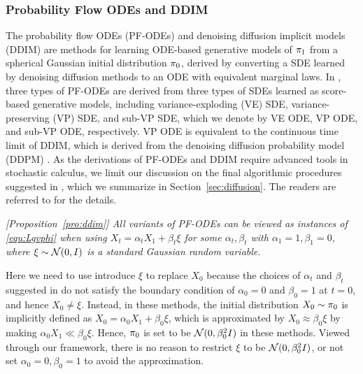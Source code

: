 \subsubsection{Probability Flow ODEs and DDIM} 
The probability flow ODEs (PF-ODEs) \cite{song2020score}  and denoising diffusion implicit models (DDIM)  \cite{song2020denoising} 
are methods for learning  ODE-based generative models of ${\pi}_1$ from a spherical Gaussian initial distribution ${\pi}_0$, derived by converting a SDE learned by  
denoising diffusion methods to an ODE 
with equivalent marginal laws. 
In \cite{song2020score}, 
three types of PF-ODEs are derived from 
three types of SDEs learned as score-based generative models,  including 
variance-exploding (VE) SDE,
variance-preserving (VP) SDE,
and sub-VP SDE, 
which we denote by 
VE ODE, VP ODE, and sub-VP ODE, respectively. 
VP ODE is equivalent to the continuous time limit of DDIM, 
which is derived from the denoising diffusion probability model (DDPM) \cite{ho2020denoising}. 
As the derivations of PF-ODEs and DDIM 
require advanced tools in stochastic calculus, 
we limit our discussion on the final algorithmic  procedures suggested in \cite{song2020score, ho2020denoising}, which we summarize in Section~\ref{sec:diffusion}.  
The readers are referred to \cite{song2020score, song2020denoising} for the details. 



\emph{[Proposition~\ref{pro:ddim}] 
All variants of PF-ODEs 
can be 
viewed as instances of \eqref{equ:Lgvphi}  
when using 
$X_t = \alpha_t X_1 +
\beta_t \xi$ for some $\alpha_t,\beta_t$ with $\alpha_1=1,\beta_1=0$, where 
$\xi \sim \mathcal{N}(0, I)$ is a standard Gaussian random variable. 
}

Here we need to use introduce $\xi$ to replace $X_0$ because the choices of $\alpha_t$ and $\beta_t$  suggested in \cite{song2020score, song2020denoising, ho2020denoising} 
do not satisfy the boundary condition of $\alpha_0 = 0$ and $\beta_0 = 1$ at $t=0$, and hence $X_0 \neq \xi$. 
Instead,  
in these methods, the initial distribution $X_0\sim {\pi}_0$ is implicitly defined as $X_0 = \alpha_0  X_1 + \beta_0 \xi$, 
which is approximated by $X_0 \approx \beta_0 \xi $ by making $\alpha_0 X_1 \ll \beta_0 \xi$.   
Hence, ${\pi}_0$ is set to be  $\mathcal{N}(0, \beta_0^2 I)$ in these methods. 
Viewed through our framework, 
there is no reason to restrict $\xi$ to be $\mathcal{N}(0, \beta_0^2 I)$,  %
or not set $\alpha_0=0,\beta_0=1$ to avoid the approximation. 

